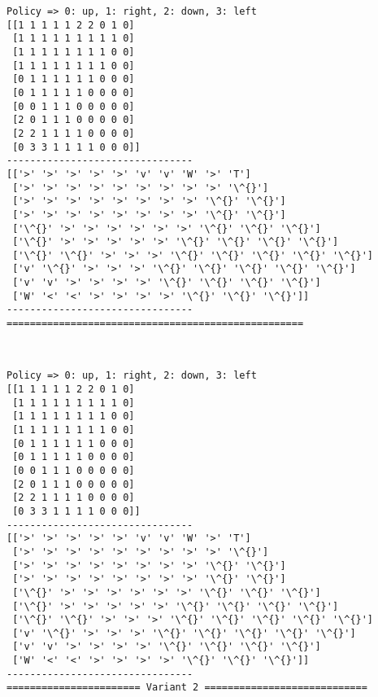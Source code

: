 \documentclass[11pt]{article}
\begin{document}
    \begin{Verbatim}[commandchars=\\\{\}]
Policy => 0: up, 1: right, 2: down, 3: left
[[1 1 1 1 1 2 2 0 1 0]
 [1 1 1 1 1 1 1 1 1 0]
 [1 1 1 1 1 1 1 1 0 0]
 [1 1 1 1 1 1 1 1 0 0]
 [0 1 1 1 1 1 1 0 0 0]
 [0 1 1 1 1 1 0 0 0 0]
 [0 0 1 1 1 0 0 0 0 0]
 [2 0 1 1 1 0 0 0 0 0]
 [2 2 1 1 1 1 0 0 0 0]
 [0 3 3 1 1 1 1 0 0 0]]
--------------------------------
[['>' '>' '>' '>' '>' 'v' 'v' 'W' '>' 'T']
 ['>' '>' '>' '>' '>' '>' '>' '>' '>' '\^{}']
 ['>' '>' '>' '>' '>' '>' '>' '>' '\^{}' '\^{}']
 ['>' '>' '>' '>' '>' '>' '>' '>' '\^{}' '\^{}']
 ['\^{}' '>' '>' '>' '>' '>' '>' '\^{}' '\^{}' '\^{}']
 ['\^{}' '>' '>' '>' '>' '>' '\^{}' '\^{}' '\^{}' '\^{}']
 ['\^{}' '\^{}' '>' '>' '>' '\^{}' '\^{}' '\^{}' '\^{}' '\^{}']
 ['v' '\^{}' '>' '>' '>' '\^{}' '\^{}' '\^{}' '\^{}' '\^{}']
 ['v' 'v' '>' '>' '>' '>' '\^{}' '\^{}' '\^{}' '\^{}']
 ['W' '<' '<' '>' '>' '>' '>' '\^{}' '\^{}' '\^{}']]
--------------------------------
===================================================

    \end{Verbatim}

    \begin{center}
    \end{center}
    { \hspace*{\fill} \\}
    
    \begin{Verbatim}[commandchars=\\\{\}]
Policy => 0: up, 1: right, 2: down, 3: left
[[1 1 1 1 1 2 2 0 1 0]
 [1 1 1 1 1 1 1 1 1 0]
 [1 1 1 1 1 1 1 1 0 0]
 [1 1 1 1 1 1 1 1 0 0]
 [0 1 1 1 1 1 1 0 0 0]
 [0 1 1 1 1 1 0 0 0 0]
 [0 0 1 1 1 0 0 0 0 0]
 [2 0 1 1 1 0 0 0 0 0]
 [2 2 1 1 1 1 0 0 0 0]
 [0 3 3 1 1 1 1 0 0 0]]
--------------------------------
[['>' '>' '>' '>' '>' 'v' 'v' 'W' '>' 'T']
 ['>' '>' '>' '>' '>' '>' '>' '>' '>' '\^{}']
 ['>' '>' '>' '>' '>' '>' '>' '>' '\^{}' '\^{}']
 ['>' '>' '>' '>' '>' '>' '>' '>' '\^{}' '\^{}']
 ['\^{}' '>' '>' '>' '>' '>' '>' '\^{}' '\^{}' '\^{}']
 ['\^{}' '>' '>' '>' '>' '>' '\^{}' '\^{}' '\^{}' '\^{}']
 ['\^{}' '\^{}' '>' '>' '>' '\^{}' '\^{}' '\^{}' '\^{}' '\^{}']
 ['v' '\^{}' '>' '>' '>' '\^{}' '\^{}' '\^{}' '\^{}' '\^{}']
 ['v' 'v' '>' '>' '>' '>' '\^{}' '\^{}' '\^{}' '\^{}']
 ['W' '<' '<' '>' '>' '>' '>' '\^{}' '\^{}' '\^{}']]
--------------------------------
======================= Variant 2 ============================

    \end{Verbatim}
\end{document}

